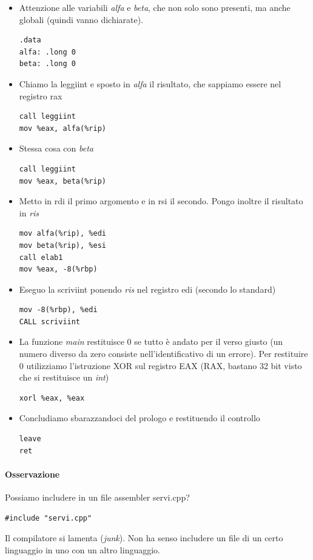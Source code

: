 \documentclass[11pt]{report}
\theoremstyle{definition}
\begin{document}
\begin{itemize}
\begin{itemize}
\begin{framed}
\begin{center}
\end{center}
\end{framed}
\end{itemize}
\item Attenzione alle variabili \emph{alfa} e \emph{beta}, che non solo sono presenti, ma anche globali (quindi vanno dichiarate).
\begin{verbatim}
.data
alfa: .long 0
beta: .long 0
\end{verbatim}
\item Chiamo la leggiint e sposto in \emph{alfa} il risultato, che sappiamo essere nel registro rax
\begin{verbatim}
call leggiint
mov %eax, alfa(%rip)
\end{verbatim}
\item Stessa cosa con \emph{beta}
\begin{verbatim}
call leggiint
mov %eax, beta(%rip)
\end{verbatim}
\item Metto in rdi il primo argomento e in rsi il secondo. Pongo inoltre il risultato in \emph{ris}
\begin{verbatim}
mov alfa(%rip), %edi
mov beta(%rip), %esi
call elab1
mov %eax, -8(%rbp)
\end{verbatim}
\item Eseguo la scriviint ponendo \emph{ris} nel registro edi (secondo lo standard)
\begin{verbatim}
mov -8(%rbp), %edi
CALL scriviint
\end{verbatim}
\item La funzione \emph{main} restituisce $0$ se tutto è andato per il verso giusto (un numero diverso da zero consiste nell'identificativo di un errore). Per restituire $0$ utilizziamo l'istruzione XOR sul registro EAX (RAX, bastano 32 bit visto che si restituisce un \emph{int})
\begin{verbatim}
xorl %eax, %eax
\end{verbatim}
\item Concludiamo sbarazzandoci del prologo e restituendo il controllo
\begin{verbatim}
leave
ret
\end{verbatim}
\end{itemize}
\paragraph{Osservazione} Possiamo includere in un file assembler servi.cpp?
\begin{verbatim}
#include "servi.cpp"
\end{verbatim}
Il compilatore si lamenta (\emph{junk}). Non ha senso includere un file di un certo linguaggio in uno con un altro linguaggio. 
\end{document}
